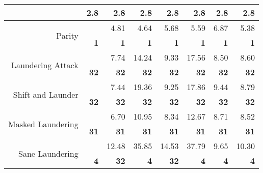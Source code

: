\begin{center}
\begin{table}[]
\begin{tabular}{rr|rrrrrr}
                                      & \textbf{2.8} & \textbf{2.8} & \multicolumn{1}{r|}{\textbf{2.8}} & \textbf{2.8} & \multicolumn{1}{r|}{\textbf{2.8}} & \textbf{2.8}      & \textbf{2.8}     \\ \hline
\multirow{2}{*}{Parity}               &              & 4.81         & \multicolumn{1}{r|}{4.64}         & 5.68         & \multicolumn{1}{r|}{5.59}         & 6.87              & 5.38             \\
                                      & \textbf{1}   & \textbf{1}   & \multicolumn{1}{r|}{\textbf{1}}   & \textbf{1}   & \multicolumn{1}{r|}{\textbf{1}}   & \textbf{1}        & \textbf{1}       \\ \hline
\multirow{2}{*}{Laundering Attack}    &              & 7.74         & \multicolumn{1}{r|}{14.24}        & 9.33         & \multicolumn{1}{r|}{17.56}        & 8.50              & 8.60             \\
                                      & \textbf{32}  & \textbf{32}  & \multicolumn{1}{r|}{\textbf{32}}  & \textbf{32}  & \multicolumn{1}{r|}{\textbf{32}}  & \textbf{32}       & \textbf{32}      \\ \hline
\multirow{2}{*}{Shift and Launder}    &              & 7.44         & \multicolumn{1}{r|}{19.36}        & 9.25         & \multicolumn{1}{r|}{17.86}        & 9.44              & 8.79             \\
                                      & \textbf{32}  & \textbf{32}  & \multicolumn{1}{r|}{\textbf{32}}  & \textbf{32}  & \multicolumn{1}{r|}{\textbf{32}}  & \textbf{32}       & \textbf{32}      \\ \hline
\multirow{2}{*}{Masked Laundering}    &              & 6.70         & \multicolumn{1}{r|}{10.95}        & 8.34         & \multicolumn{1}{r|}{12.67}        & 8.71              & 8.52             \\
                                      & \textbf{31}  & \textbf{31}  & \multicolumn{1}{r|}{\textbf{31}}  & \textbf{31}  & \multicolumn{1}{r|}{\textbf{31}}  & \textbf{31}       & \textbf{31}      \\ \hline
\multirow{2}{*}{Sane Laundering}      &              & 12.48        & \multicolumn{1}{r|}{35.85}        & 14.53        & \multicolumn{1}{r|}{37.79}        & 9.65              & 10.30            \\
                                      & \textbf{4}   & \textbf{32}  & \multicolumn{1}{r|}{\textbf{4}}   & \textbf{32}  & \multicolumn{1}{r|}{\textbf{4}}   & \textbf{4}        & \textbf{4}       \\ \hline

\end{tabular}
\end{table}
\end{center}
